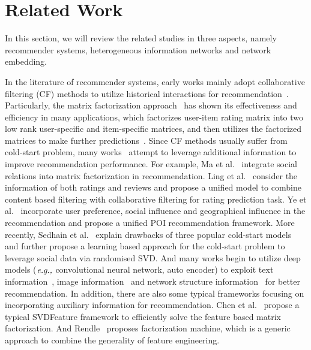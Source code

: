 \section{Related Work \label{sec-rel}}
In this section, we will review the related studies in three aspects, namely recommender systems, heterogeneous information networks and network embedding.

In the literature of recommender systems, early works mainly adopt collaborative filtering (CF) methods to utilize historical interactions for recommendation~\cite{schafer2007collaborative}. Particularly, the matrix factorization approach~\cite{koren2009matrix,shi2012adaptive} has shown its effectiveness and efficiency in many applications, which factorizes user-item rating matrix into two low rank user-specific and item-specific matrices, and then utilizes the factorized matrices to make further predictions~\cite{koren2015advances}. Since CF methods usually suffer from cold-start problem, many works~\cite{yin2013lcars,feng2012incorporating,hong2013co} attempt to leverage additional information to improve recommendation performance. For example, Ma et al.~\cite{ma2011recommender} integrate social relations into matrix factorization in recommendation. Ling et al.~\cite{ling2014ratings} consider the information of both ratings and reviews and propose a unified model to combine content based filtering with collaborative filtering for rating prediction task. Ye et al.~\cite{ye2011exploiting} incorporate user preference, social influence and geographical influence in the recommendation and propose a unified POI recommendation framework. More recently, Sedhain et al.~\cite{sedhain2017low} explain drawbacks of three popular cold-start models~\cite{gantner2010learning,krohn2012multi,sedhain2014social} and further propose a learning based approach for the cold-start problem to leverage social data via randomised SVD. And many works begin to utilize deep models ($\emph{e.g.,}$ convolutional neural network, auto encoder) to exploit text information~\cite{zheng2017joint}, image information~\cite{he2016vbpr} and network structure information~\cite{zhang2016collaborative} for better recommendation. In addition, there are also some typical frameworks focusing on incorporating auxiliary information for recommendation. Chen et al.~\cite{chen2012svdfeature} propose a typical SVDFeature framework to efficiently solve the feature based matrix factorization. And Rendle~\cite{rendle2010factorization} proposes factorization machine, which is a generic approach to combine the generality of feature engineering.

